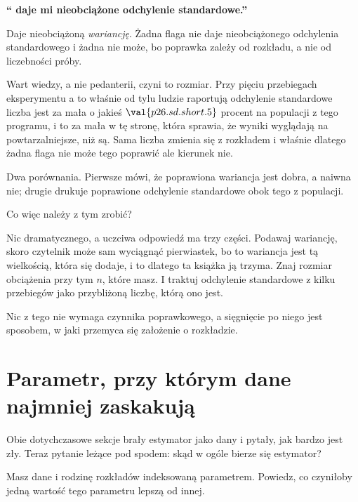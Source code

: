 \begin{fr}
\begin{trapbox}
\textbf{\enquote{ daje mi nieobciążone odchylenie standardowe.}}

Daje nieobciążoną \emph{wariancję}. Żadna flaga  nie daje
nieobciążonego odchylenia standardowego i żadna nie może, bo poprawka zależy
od rozkładu, a nie od liczebności próby.

Wart wiedzy, a nie pedanterii, czyni to rozmiar. Przy pięciu przebiegach
eksperymentu \dash{} a to właśnie od tylu ludzie raportują odchylenie
standardowe \dash{} liczba jest za mała o jakieś
$\val{p26.sd.short.5}$ procent na populacji z tego programu, i to za mała w tę
stronę, która sprawia, że wyniki wyglądają na powtarzalniejsze, niż są. Sama
liczba zmienia się z rozkładem \dash{} i właśnie dlatego żadna flaga nie może
tego poprawić \dash{} ale kierunek nie.
\end{trapbox}
\end{fr}

\begin{fr}

Dwa porównania. Pierwsze mówi, że poprawiona wariancja jest dobra, a naiwna
nie; drugie drukuje poprawione odchylenie standardowe obok tego z populacji.
\end{fr}

\begin{fr}
Co więc należy z tym zrobić?

Nic dramatycznego, a uczciwa odpowiedź ma trzy części. Podawaj wariancję,
skoro czytelnik może sam wyciągnąć pierwiastek, bo to wariancja jest tą
wielkością, która się dodaje, i to dlatego ta książka ją trzyma. Znaj rozmiar
obciążenia przy tym $n$, które masz. I traktuj odchylenie standardowe z
kilku przebiegów jako przybliżoną liczbę, którą ono jest.

Nic z tego nie wymaga czynnika poprawkowego, a sięgnięcie po niego jest
sposobem, w jaki przemyca się założenie o rozkładzie.
\end{fr}

\section{Parametr, przy którym dane najmniej zaskakują}
\label{sec:P26-mle}

\begin{fr}
Obie dotychczasowe sekcje brały estymator jako dany i pytały, jak bardzo jest
zły. Teraz pytanie leżące pod spodem: skąd w ogóle bierze się estymator?

Masz dane i rodzinę rozkładów indeksowaną parametrem. Powiedz, co czyniłoby
jedną wartość tego parametru lepszą od innej.
\dotline
\nextframe
\end{fr}

